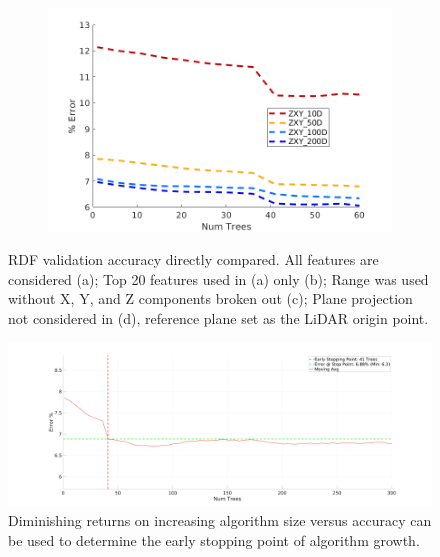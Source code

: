 \documentclass[journal,onecolumn]{IEEEtran}
\begin{document}
\begin{figure}[H]
\begin{subfigure}{0.45\textwidth}
			\caption[]{}
			\label{fig:range_mls_ransac_comp}
		\end{subfigure}
		\begin{subfigure}{0.45\textwidth}
			\centering
			\includegraphics[width=1\linewidth]{figures/ZXY}
			\caption[]{}
			\label{fig:t20_mls_ransac_comp}
		\end{subfigure}
		\caption[RDF Validation Accuracy]{RDF validation accuracy directly compared. All features are considered (a); Top 20 features used in (a) only (b); Range was used without X, Y, and Z components broken out (c); Plane projection not considered in (d), reference plane set as the LiDAR origin point.}
		\label{fig:all_tree_comp}
	\end{figure}

	\begin{figure}[H]
			\centering
			\includegraphics[width=0.75\linewidth]{figures/mls_zxy_early_stopping}
			\caption[Early Stopping]{Diminishing returns on increasing algorithm size versus accuracy can be used to determine the early stopping point of algorithm growth.}
			\label{fig:mls_zxy_early_stopping}
	\end{figure}
	
	
\end{document}
